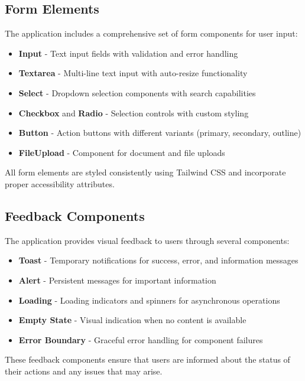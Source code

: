 \subsection{Form Elements}

The application includes a comprehensive set of form components for user input:

\begin{itemize}
  \item \textbf{Input} - Text input fields with validation and error handling
  \item \textbf{Textarea} - Multi-line text input with auto-resize functionality
  \item \textbf{Select} - Dropdown selection components with search capabilities
  \item \textbf{Checkbox} and \textbf{Radio} - Selection controls with custom styling
  \item \textbf{Button} - Action buttons with different variants (primary, secondary, outline)
  \item \textbf{FileUpload} - Component for document and file uploads
\end{itemize}

All form elements are styled consistently using Tailwind CSS and incorporate proper accessibility attributes.

\subsection{Feedback Components}

The application provides visual feedback to users through several components:

\begin{itemize}
  \item \textbf{Toast} - Temporary notifications for success, error, and information messages
  \item \textbf{Alert} - Persistent messages for important information
  \item \textbf{Loading} - Loading indicators and spinners for asynchronous operations
  \item \textbf{Empty State} - Visual indication when no content is available
  \item \textbf{Error Boundary} - Graceful error handling for component failures
\end{itemize}

These feedback components ensure that users are informed about the status of their actions and any issues that may arise.

